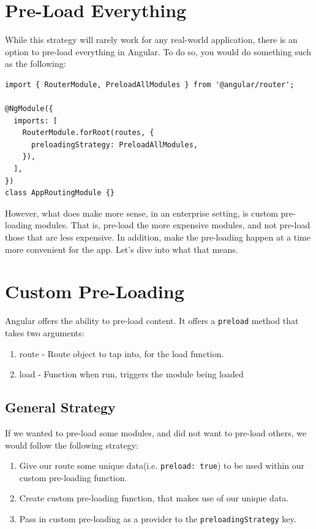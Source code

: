 \section{Pre-Load Everything}
While this strategy will rarely work for any real-world application, there is 
an option to pre-load everything in Angular. To do so, you would do something 
such as the following: 
\begin{lstlisting}
import { RouterModule, PreloadAllModules } from '@angular/router';

@NgModule({
  imports: [
    RouterModule.forRoot(routes, {
      preloadingStrategy: PreloadAllModules,
    }),
  ],
})
class AppRoutingModule {}
\end{lstlisting}

However, what does make more sense, in an enterprise setting, is custom pre-loading
modules. That is, pre-load the more expensive modules, and not pre-load those that 
are less expensive. In addition, make the pre-loading happen at a time more 
convenient for the app. Let's dive into what that means.

\section{ Custom Pre-Loading }
Angular offers the ability to pre-load content. It offers a \lstinline{preload}
method that takes two arguments: 
\begin{enumerate}
  \item route - Route object to tap into, for the load function.
  \item load - Function when run, triggers the module being loaded
\end{enumerate}

\subsection{General Strategy}
If we wanted to pre-load some modules, and did not want to pre-load others, we
would follow the following strategy:
\begin{enumerate}
  \item Give our route some unique data(i.e. \lstinline{preload: true})
   to be used within our custom pre-loading function.
  \item Create custom pre-loading function, that makes use of our unique data. 
  \item Pass in custom pre-loading as a provider to the \lstinline{preloadingStrategy} 
  key.
\end{enumerate}

